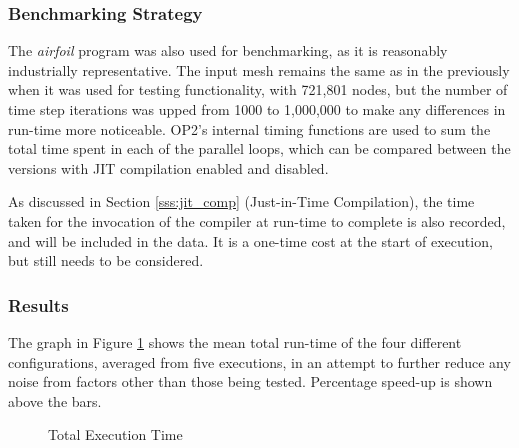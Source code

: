 \subsubsection{Benchmarking Strategy}
The \textit{airfoil} program was also used for benchmarking, as it is reasonably industrially representative. The input mesh remains the same as in the previously when it was used for testing functionality, with 721,801 nodes, but the number of time step iterations was upped from 1000 to 1,000,000 to make any differences in run-time more noticeable. OP2's internal timing functions are used to sum the total time spent in each of the parallel loops, which can be compared between the versions with JIT compilation enabled and disabled.
\par
As discussed in Section \ref{sss:jit_comp} (Just-in-Time Compilation), the time taken for the invocation of the compiler at run-time to complete is also recorded, and will be included in the data. It is a one-time cost at the start of execution, but still needs to be considered.

\subsubsection{Results}
The graph in Figure \ref{fig:res_total} shows the mean total run-time of the four different configurations, averaged from five executions, in an attempt to further reduce any noise from factors other than those being tested. Percentage speed-up is shown above the bars.

\begin{figure}[h!]
\begin{center}
\caption{Total Execution Time}
\label{fig:res_total}
\pgfplotsset{width=.6\linewidth,compat=1.8}
\end{center}
\vspace{-1cm}
\end{figure}

